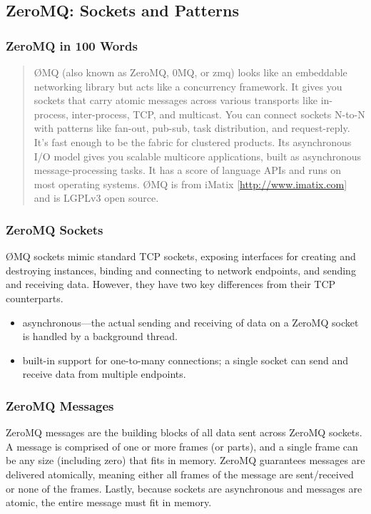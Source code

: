 \documentclass{beamer}
\newcommand{\bei}{\begin{itemize}}
\newcommand{\eei}{\end{itemize}}
\begin{document}
\subsection{ZeroMQ: Sockets and Patterns}

\begin{frame}
\frametitle{ZeroMQ in 100 Words}
\begin{quote}
\O MQ (also known as ZeroMQ, 0MQ, or zmq) looks like an embeddable networking library but acts like a concurrency
framework. It gives you sockets that carry atomic messages across various transports like in-process, inter-process,
TCP, and multicast. You can connect sockets N-to-N with patterns like fan-out, pub-sub, task distribution, and
request-reply. It's fast enough to be the fabric for clustered products. Its asynchronous I/O model gives you scalable
multicore applications, built as asynchronous message-processing tasks. It has a score of language APIs and runs on most
operating systems. \O MQ is from iMatix [\url{http://www.imatix.com}] and is LGPLv3 open source.
\end{quote}
\end{frame}

\begin{frame}
\frametitle{ZeroMQ Sockets}
\O MQ sockets mimic standard TCP sockets, exposing interfaces for creating and destroying instances, binding and
connecting to network endpoints, and sending and receiving data. However, they have two key differences from their
TCP counterparts.

\bei
\item asynchronous---the actual sending and receiving of data on a ZeroMQ socket is handled by a background thread.
\item built-in support for one-to-many connections; a single socket can send and receive data from multiple endpoints.
\eei
\end{frame}

\begin{frame}
\frametitle{ZeroMQ Messages}
ZeroMQ messages are the building blocks of all data sent across ZeroMQ sockets. A message is comprised of one or more
frames (or parts), and a single frame can be any size (including zero) that fits in memory. ZeroMQ guarantees messages
are delivered atomically, meaning either all frames of the message are sent/received or none of the frames. Lastly,
because sockets are asynchronous and messages are atomic, the entire message must fit in memory.
\end{frame}
\end{document}
